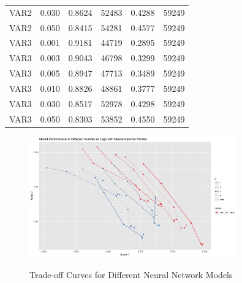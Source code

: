 \documentclass{article}
\begin{document}
\begin{table}[htbp]
\begin{center}
\begin{tabular}{l|l|*{4}{c}}
      VAR2 & 0.030 & 0.8624 & 52483 & 0.4288 & 59249\\
      VAR2 & 0.050 & 0.8415 & 54281 & 0.4577 & 59249\\
      VAR3 & 0.001 & 0.9181 & 44719 & 0.2895 & 59249\\
      VAR3 & 0.003 & 0.9043 & 46798 & 0.3299 & 59249\\
      VAR3 & 0.005 & 0.8947 & 47713 & 0.3489 & 59249\\
      VAR3 & 0.010 & 0.8826 & 48861 & 0.3777 & 59249\\
      VAR3 & 0.030 & 0.8517 & 52978 & 0.4298 & 59249\\
      VAR3 & 0.050 & 0.8303 & 53852 & 0.4550 & 59249\\
    \end{tabular}
  \end{center}
\end{table}

\begin{figure}[htbp]
    \caption{Trade-off Curves for Different Neural Network Models}
    \centering
    \includegraphics[width = 0.8\textwidth]{images/ModelPerformanceatDifferentNumberofLagswithNeuralNetworkModels.png}
    \label{fig:fig1.3.7}
\end{figure}
\end{document}
